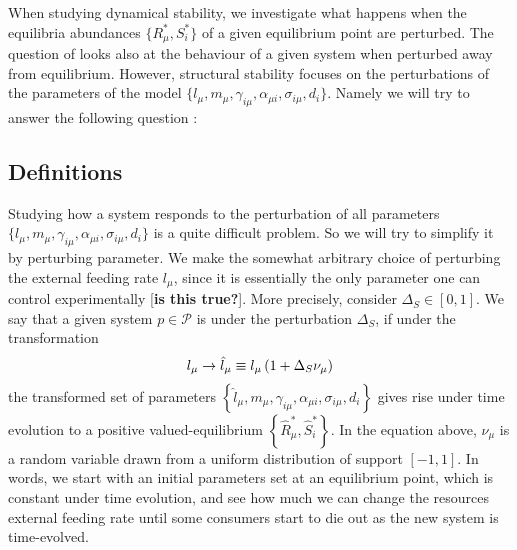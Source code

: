\documentclass[12pt, titlepage]{report}
\begin{document}
When studying dynamical stability, we investigate what happens when the equilibria abundances $\{R^*_\mu, S^*_i\}$ of a given equilibrium point are perturbed. The question of  looks also at the behaviour of a given system when perturbed away from equilibrium. However, structural stability focuses on the perturbations of the parameters of the model \ie  $\{l_\mu, m_\mu, \gamma_{i\mu}, \alpha_{\mu i}, \sigma_{i\mu},d_i\}$. Namely we will try to answer the following question :

\begin{centering}
\end{centering}

\subsection{Definitions}
Studying how a system responds to the perturbation of all parameters $\{l_\mu, m_\mu, \gamma_{i\mu}, \alpha_{\mu i}, \sigma_{i\mu},d_i\}$ is a quite difficult problem. So we will try to simplify it by perturbing  parameter. We make the somewhat arbitrary choice of perturbing the external feeding rate $l_\mu$, since it is essentially the only parameter one can control experimentally [\textbf{is this true?}]. More precisely, consider $\Delta_S \in [0,1]$. We say that a given system $p \in \mathcal{P}$ is  under the perturbation $\Delta_S$, if under the transformation
\begin{equation}
l_\mu \rightarrow \hat{l}_\mu \equiv l_\mu\left( 1+\Delta_S \nu_\mu \right)
\end{equation}
the transformed set of parameters $\left\{ \hat{l}_\mu, m_\mu, \gamma_{i\mu}, \alpha_{\mu i}, \sigma_{i\mu},d_i \right\}$ gives rise under time evolution to a positive valued-equilibrium $\left\{\hat{R}^*_\mu, \hat{S}^*_i\right\}$. In the equation above, $\nu_\mu$ is a random variable drawn from a uniform distribution of support $[-1, 1]$. In words, we start with an initial parameters set at an equilibrium point, which is constant under time evolution, and see how much we can change the resources external feeding rate until some consumers start to die out as the new system is time-evolved.
\end{document}
